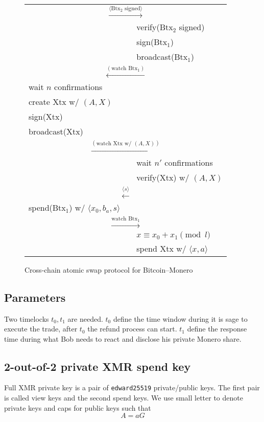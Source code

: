 \documentclass{llncs}
\begin{document}
\begin{figure}[H]
\begin{table}[H]
\begin{scriptsize}
{\begin{tabular}{ | l l l | }
          \multicolumn{3}{|c|}{$\xrightarrow{\langle \text{Btx}_2 \text{ signed} \rangle}$} \\
          & & verify($\text{Btx}_2$ signed) \\
          & & sign($\text{Btx}_1$) \\
          & & broadcast($\text{Btx}_1$) \\
          \multicolumn{3}{|c|}{$\xleftarrow{(\text{watch Btx}_1)}$} \\
          wait $n$ confirmations & & \\
          create Xtx w/ $(A, X)$ & & \\
          sign(Xtx) & & \\
          broadcast(Xtx) & & \\
          \multicolumn{3}{|c|}{$\xrightarrow{(\text{watch Xtx w/ } (A, X))}$} \\
          & & wait $n'$ confirmations \\
          & & verify(Xtx) w/ $(A, X)$ \\
          \multicolumn{3}{|c|}{$\xleftarrow{\langle s \rangle}$} \\
          spend($\text{Btx}_1$) w/ $\langle x_0, b_a, s \rangle$ & & \\
          \multicolumn{3}{|c|}{$\xrightarrow{\text{watch Btx}_1}$} \\
          & & $x \equiv x_0 + x_1 \pmod l$ \\
          & & spend Xtx w/ $\langle x, a \rangle$ \\
        \hline
      \end{tabular}}
      \end{scriptsize}
    \end{table}

  \caption{Cross-chain atomic swap protocol for Bitcoin--Monero}
  \label{fig:protocol}
\end{figure}

\subsection{Parameters}
Two timelocks $t_0, t_1$ are needed. $t_0$ define the time window during it is sage to execute the trade, after $t_0$ the refund process can start. $t_1$ define the response time during what Bob needs to react and disclose his private Monero share.

\subsection{2-out-of-2 private XMR spend key}
Full XMR private key is a pair of \texttt{edward25519} private/public keys. The first pair is called view keys and the second spend keys. We use small letter to denote private keys and caps for public keys such that
$$A = aG$$
\end{document}

